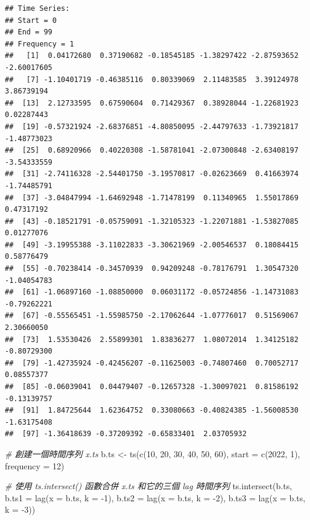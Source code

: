 \documentclass[
]{book}
\newenvironment{Shaded}{\begin{snugshade}}{\end{snugshade}}
\newcommand{\AttributeTok}[1]{\textcolor[rgb]{0.77,0.63,0.00}{#1}}
\newcommand{\CommentTok}[1]{\textcolor[rgb]{0.56,0.35,0.01}{\textit{#1}}}
\newcommand{\DecValTok}[1]{\textcolor[rgb]{0.00,0.00,0.81}{#1}}
\newcommand{\FunctionTok}[1]{\textcolor[rgb]{0.00,0.00,0.00}{#1}}
\newcommand{\NormalTok}[1]{#1}
\newcommand{\OtherTok}[1]{\textcolor[rgb]{0.56,0.35,0.01}{#1}}
\newcommand{\SpecialCharTok}[1]{\textcolor[rgb]{0.00,0.00,0.00}{#1}}
\theoremstyle{definition}
\theoremstyle{definition}
\theoremstyle{definition}
\theoremstyle{definition}
\theoremstyle{remark}
\begin{document}
\begin{verbatim}
## Time Series:
## Start = 0 
## End = 99 
## Frequency = 1 
##   [1]  0.04172680  0.37190682 -0.18545185 -1.38297422 -2.87593652 -2.60017605
##   [7] -1.10401719 -0.46385116  0.80339069  2.11483585  3.39124978  3.86739194
##  [13]  2.12733595  0.67590604  0.71429367  0.38928044 -1.22681923  0.02287443
##  [19] -0.57321924 -2.68376851 -4.80850095 -2.44797633 -1.73921817 -1.48773023
##  [25]  0.68920966  0.40220308 -1.58781041 -2.07300848 -2.63408197 -3.54333559
##  [31] -2.74116328 -2.54401750 -3.19570817 -0.02623669  0.41663974 -1.74485791
##  [37] -3.04847994 -1.64692948 -1.71478199  0.11340965  1.55017869  0.47317192
##  [43] -0.18521791 -0.05759091 -1.32105323 -1.22071881 -1.53827085  0.01277076
##  [49] -3.19955388 -3.11022833 -3.30621969 -2.00546537  0.18084415  0.58776479
##  [55] -0.70238414 -0.34570939  0.94209248 -0.78176791  1.30547320 -1.04054783
##  [61] -1.06897160 -1.08850000  0.06031172 -0.05724856 -1.14731083 -0.79262221
##  [67] -0.55565451 -1.55985750 -2.17062644 -1.07776017  0.51569067  2.30660050
##  [73]  1.53530426  2.55899301  1.83836277  1.08072014  1.34125182 -0.80729300
##  [79] -1.42735924 -0.42456207 -0.11625003 -0.74807460  0.70052717  0.08557377
##  [85] -0.06039041  0.04479407 -0.12657328 -1.30097021  0.81586192 -0.13139757
##  [91]  1.84725644  1.62364752  0.33080663 -0.40824385 -1.56008530 -1.63175408
##  [97] -1.36418639 -0.37209392 -0.65833401  2.03705932
\end{verbatim}

\begin{Shaded}
\begin{Highlighting}[]
\CommentTok{\# 創建一個時間序列 x.ts}
\NormalTok{b.ts }\OtherTok{\textless{}{-}} \FunctionTok{ts}\NormalTok{(}\FunctionTok{c}\NormalTok{(}\DecValTok{10}\NormalTok{, }\DecValTok{20}\NormalTok{, }\DecValTok{30}\NormalTok{, }\DecValTok{40}\NormalTok{, }\DecValTok{50}\NormalTok{, }\DecValTok{60}\NormalTok{), }\AttributeTok{start =} \FunctionTok{c}\NormalTok{(}\DecValTok{2022}\NormalTok{, }\DecValTok{1}\NormalTok{), }\AttributeTok{frequency =} \DecValTok{12}\NormalTok{)}

\CommentTok{\# 使用 ts.intersect() 函數合併 x.ts 和它的三個 lag 時間序列}
\FunctionTok{ts.intersect}\NormalTok{(b.ts, }\AttributeTok{b.ts1 =} \FunctionTok{lag}\NormalTok{(}\AttributeTok{x =}\NormalTok{ b.ts, }\AttributeTok{k =} \SpecialCharTok{{-}}\DecValTok{1}\NormalTok{), }\AttributeTok{b.ts2 =} \FunctionTok{lag}\NormalTok{(}\AttributeTok{x =}\NormalTok{ b.ts, }\AttributeTok{k =} \SpecialCharTok{{-}}\DecValTok{2}\NormalTok{), }\AttributeTok{b.ts3 =} \FunctionTok{lag}\NormalTok{(}\AttributeTok{x =}\NormalTok{ b.ts, }\AttributeTok{k =} \SpecialCharTok{{-}}\DecValTok{3}\NormalTok{))}
\end{Highlighting}
\end{Shaded}
\end{document}
